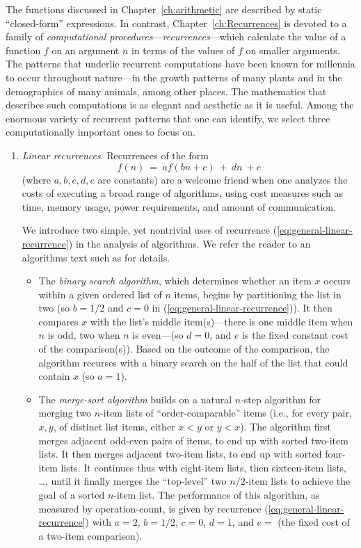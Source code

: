 The functions discussed in Chapter~\ref{ch:arithmetic} are described by static ``closed-form'' expressions.  In contrast, Chapter~\ref{ch:Recurrences} is devoted to a family of {\em computational procedures}---{\it recurrences}---which calculate the value of a function $f$ on an argument $n$ in terms of the values of $f$ on smaller arguments.  The patterns that underlie recurrent computations have been known for millennia to occur throughout nature---in the growth patterns of many plants and in the demographics of many animals, among other places.  The mathematics that describes such computations is as elegant and aesthetic as it is useful.  Among
the enormous variety of recurrent patterns that one can identify, we select three computationally important ones to focus on.
\begin{enumerate}
\item
{\it Linear recurrences}.  Recurrences of the form
\begin{equation}
\label{eq:general-linear-recurrence}
f(n) \ = \ a f(bn+c) \ + \ dn \ + e
\end{equation}
(where $a, b, c, d, e$ are constants) are a welcome friend when one analyzes the costs of executing a broad range of algorithms, using cost measures such as time, memory usage, power requirements, and amount of communication.

\smallskip

We introduce two simple, yet nontrivial uses of recurrence (\ref{eq:general-linear-recurrence}) in the analysis of algorithms. We refer the reader to an algorithms text such as \cite{CLRS} for
details.

  \begin{itemize}
  \item
The {\em binary search algorithm}, which determines whether an item $x$ occurs within a given ordered list of $n$ items, begins by partitioning the list in two (so $b = 1/2$ and $c = 0$ in
(\ref{eq:general-linear-recurrence})).  It then compares $x$ with the list's middle item(s)---there is one middle item when $n$ is odd, two when $n$ is even---(so $d = 0$, and $e$ is the fixed constant cost of the comparison(s)).  Based on the outcome of the comparison, the algorithm recurses with a binary search on the half of the list that could contain $x$ (so $a = 1$).

  \medskip\item
The {\em merge-sort algorithm} builds on a natural $n$-step algorithm for merging two $n$-item lists of ``order-comparable'' items (i.e., for every pair, $x,y$, of distinct list items, either $x < y$ or $y < x$).  The algorithm first merges adjacent odd-even pairs of items, to end up with sorted two-item lists.  It then merges adjacent two-item lists, to end up with sorted four-item lists.  It continues thus with eight-item lists, then sixteen-item lists, \ldots, until it finally merges the ``top-level'' two $n/2$-item lists to achieve the goal of a sorted $n$-item list.  The performance of this algorithm, as measured by operation-count, is given by recurrence 
(\ref{eq:general-linear-recurrence}) with $a=2$, $b = 1/2$, $c = 0$, $d=1$, and $e =$ (the fixed cost of a two-item comparison).
  \end{itemize}


\end{enumerate}
